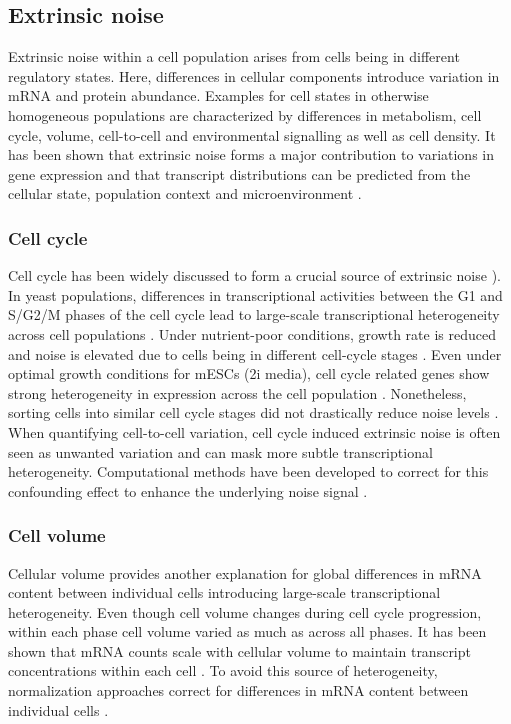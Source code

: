 \subsection{Extrinsic noise}

Extrinsic noise within a cell population arises from cells being in different regulatory states. Here, differences in cellular components introduce variation in mRNA and protein abundance. Examples for cell states in otherwise homogeneous populations are characterized by differences in metabolism, cell cycle, volume, cell-to-cell and environmental signalling as well as cell density. It has been shown that extrinsic noise forms a major contribution to variations in gene expression and that transcript distributions can be predicted from the cellular state, population context and microenvironment \citep{Battich2015a}.

\subsubsection{Cell cycle}

Cell cycle has been widely discussed to form a crucial source of extrinsic noise \citep{Colman-Lerner2005a, Newman2006}). In yeast populations, differences in transcriptional activities between the G1 and S/G2/M phases of the cell cycle lead to large-scale transcriptional heterogeneity across cell populations \citep{Zopf2013}. Under nutrient-poor conditions, growth rate is reduced and noise is elevated due to cells being in different cell-cycle stages \citep{Keren2015}.  Even under optimal growth conditions for mESCs (2i media), cell cycle related genes show strong heterogeneity in expression across the cell population \citep{Kolodziejczyk2015cell}. Nonetheless, sorting cells into similar cell cycle stages did not drastically reduce noise levels \citep{Raser2004}. When quantifying cell-to-cell variation, cell cycle induced extrinsic noise is often seen as unwanted variation and can mask more subtle transcriptional heterogeneity. Computational methods have been developed to correct for this confounding effect to enhance the underlying noise signal \citep{Buettner2015, Buettner2017}. 

\subsubsection{Cell volume}

Cellular volume provides another explanation for global differences in mRNA content between individual cells introducing large-scale transcriptional heterogeneity. Even though cell volume changes during cell cycle progression, within each phase cell volume varied as much as across all phases. It has been shown that mRNA counts scale with cellular volume to maintain transcript concentrations within each cell \citep{Kempe2015, Padovan-Merhar2015, Zhurinsky2010}. To avoid this source of heterogeneity, normalization approaches correct for differences in mRNA content between individual cells \citep{Vallejos2017}.

